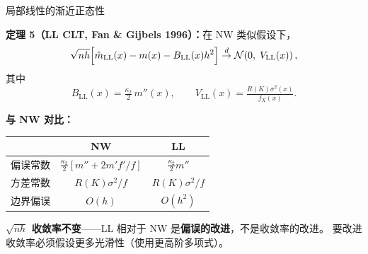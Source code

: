\documentclass[aspectratio=169, 10pt]{beamer}
\begin{document}
\begin{frame}{局部线性的渐近正态性}

  \begin{highlightbox}
    \textbf{定理 5（LL CLT, Fan \& Gijbels 1996）：}在 NW 类似假设下，
    \[
      \sqrt{nh}\Bigl[\hat m_{\text{LL}}(x) - m(x) - B_{\text{LL}}(x) h^2\Bigr]
      \overset{d}{\to} \mathcal{N}\!\left(0,\; V_{\text{LL}}(x)\right),
    \]
    其中
    \[
      B_{\text{LL}}(x) = \tfrac{\kappa_2}{2}\, m''(x),\qquad
      V_{\text{LL}}(x) = \tfrac{R(K)\sigma^2(x)}{f_X(x)}.
    \]
  \end{highlightbox}

  \vspace{0.3em}

  \textbf{与 NW 对比：}
  \begin{center}\small
  \begin{tabular}{@{}lcc@{}}
    \toprule
     & NW & LL \\
    \midrule
    偏误常数 & $\tfrac{\kappa_2}{2}[m'' + 2 m' f'/f]$ & $\tfrac{\kappa_2}{2} m''$ \\
    方差常数 & $R(K)\sigma^2/f$ & $R(K)\sigma^2/f$ \\
    边界偏误 & $O(h)$ & $O(h^2)$ \\
    \bottomrule
  \end{tabular}
  \end{center}

  \begin{keybox}
    \textbf{$\sqrt{nh}$ 收敛率不变}——LL 相对于 NW 是\textbf{偏误的改进}，不是收敛率的改进。
    要改进收敛率必须假设更多光滑性（使用更高阶多项式）。
  \end{keybox}
  \hypertarget{main-b6}{}\hfill{\scriptsize\hyperlink{proof-b6}{}}

\end{frame}
\end{document}
